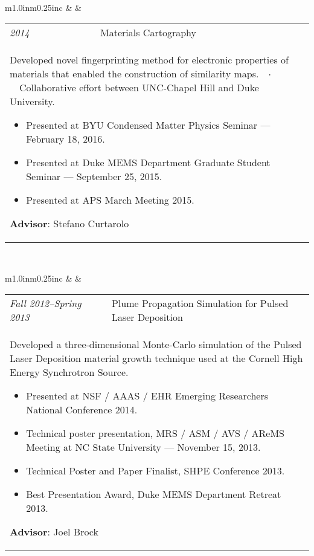 \documentclass[11pt]{article}
\begin{document}
\begin{tabular}{m{1.0in}m{0.25in}c}
 & & 
\begin{tabular}{m{0.85in}m{0.15in}m{3.75in}}
\textit{\small{2014}} & & Materials Cartography \\ \multicolumn{3}{p{4.75in}}{\footnotesize{Developed novel fingerprinting method for electronic properties of materials that enabled the construction of similarity maps.\ \ $\cdotp$\ \ Collaborative effort between UNC-Chapel Hill and Duke University. \noindent\begin{itemize}[leftmargin=*] \item Presented at BYU Condensed Matter Physics Seminar --- February 18, 2016. \item Presented at Duke MEMS Department Graduate Student Seminar --- September 25, 2015. \item Presented at APS March Meeting 2015. \end{itemize} \textbf{Advisor}: Stefano Curtarolo}} 
\end{tabular} \\ 
\end{tabular}

\vspace{0.25cm}

\begin{tabular}{m{1.0in}m{0.25in}c}
 & & 
\begin{tabular}{m{0.85in}m{0.15in}m{3.75in}}
\textit{\small{Fall 2012--Spring 2013}} & & Plume Propagation Simulation for Pulsed Laser Deposition \\ \multicolumn{3}{p{4.75in}}{\footnotesize{Developed a three-dimensional Monte-Carlo simulation of the Pulsed Laser Deposition material growth technique used at the Cornell High Energy Synchrotron Source. \noindent\begin{itemize}[leftmargin=*] \item Presented at NSF / AAAS / EHR Emerging Researchers National Conference 2014. \item Technical poster presentation, MRS / ASM / AVS / AReMS Meeting at NC State University --- November 15, 2013. \item \textcolor{NavyBlue}{Technical Poster and Paper Finalist}, SHPE Conference 2013. \item \textcolor{NavyBlue}{Best Presentation Award}, Duke MEMS Department Retreat 2013. \end{itemize} \textbf{Advisor}: Joel Brock}} 
\end{tabular} \\ 
\end{tabular}
\end{document}
